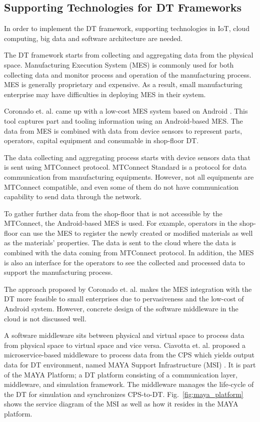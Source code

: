 \documentclass[article]{aaltoseries}
\begin{document}
\subsection{Supporting Technologies for DT Frameworks}
In order to implement the DT framework, supporting technologies in IoT, cloud computing, big data and software architecture are needed.

The DT framework starts from collecting and aggregating data from the physical space. Manufacturing Execution System (MES) is commonly used for both collecting data and monitor process and operation of the manufacturing process. MES is generally proprietary and expensive. As a result, small manufacturing enterprise may have difficulties in deploying MES in their system.

Coronado et. al. came up with a low-cost MES system based on Android \cite{UrbinaCoronado2018}. This tool captures part and tooling information using an Android-based MES. The data from MES is combined with data from device sensors to represent parts, operators, capital equipment and consumable in shop-floor DT.

The data collecting and aggregating process starts with device sensors data that is sent using MTConnect protocol. MTConnect Standard is a protocol for data communication from manufacturing equipments. However, not all equipments are MTConnect compatible, and even some of them do not have communication capability to send data through the network.

To gather further data from the shop-floor that is not accessible by the MTConnect, the Android-based MES is used. For example, operators in the shop-floor can use the MES to register the newly created or modified materials as well as the materials' properties. The data is sent to the cloud where the data is combined with the data coming from MTConnect protocol. In addition, the MES is also an interface for the operators to see the collected and processed data to support the manufacturing process.

The approach proposed by Coronado et. al. makes the MES integration with the DT more feasible to small enterprises due to pervasiveness and the low-cost of Android system. However, concrete design of the software middleware in the cloud is not discussed well.   

A software middleware sits between physical and virtual space to process data from physical space to virtual space and vice versa. Ciavotta et. al. proposed a microservice-based middleware to process data from the CPS which yields output data for DT environment, named MAYA Support Infrastructure (MSI) \cite{ciavotta2017microservice}. It is part of the MAYA Platform; a DT platform consisting of a communication layer, middleware, and simulation framework. The middleware manages the life-cycle of the DT for simulation and synchronizes CPS-to-DT. Fig.~\ref{fig:maya_platform} shows the service diagram of the MSI as well as how it resides in the MAYA platform.
\end{document}
